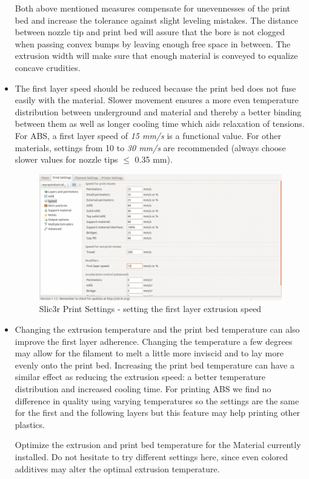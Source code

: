 \begin{itemize}
    \begin{info}
      Both above mentioned measures compensate for unevennesses of the print bed and increase the tolerance against slight leveling mistakes. The distance between nozzle tip and print bed will assure that the bore is not clogged when passing convex bumps by leaving enough free space in between. The extrusion width will make sure that enough material is conveyed to equalize concave crudities.
    \end{info}

  \item The first layer speed should be reduced because the print bed does not fuse easily 
        with the material. Slower movement ensures a more even temperature distribution between underground and material and thereby a better binding between them as well as longer cooling time which aids relaxation of tensions.
        For ABS, a first layer speed of \emph{15 mm/s} is a functional value. For other materials, settings from 10 to \emph{30 mm/s} are recommended 
        (always choose slower values for nozzle tips $\leq$ 0.35 mm). 

    \begin{figure}[H]
      \centering
      \includegraphics[width=.7\linewidth]{./img/slic3r_firstlayerspeed.png}
      \caption{Slic3r Print Settings - setting the first layer extrusion speed}
    \end{figure}

  \item Changing the extrusion temperature and the print bed temperature can also improve 
        the first layer adherence. Changing the temperature a few degrees may allow for the filament to melt a little more inviscid and to lay more evenly onto the print bed.
        Increasing the print bed temperature can have a similar effect as reducing the extrusion speed: a better temperature distribution and increased cooling time.
        For printing ABS we find no difference in quality using varying temperatures so the settings are the same for the first and the following layers but this feature may help printing other plastics.
    \begin{info}
      Optimize the extrusion and print bed temperature for the Material currently installed.
      Do not hesitate to try different settings here, since even colored additives may alter the optimal extrusion temperature.
    \end{info}


\end{itemize}
